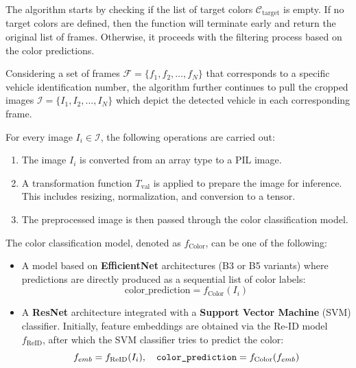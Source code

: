 The algorithm starts by checking if the list of target colors $\mathcal{C}_{\text{target}}$ is empty. If no target colors are defined, then the function will terminate early and return the original list of frames. Otherwise, it proceeds with the filtering process based on the color predictions.

Considering a set of frames \(\mathcal{F} = \{f_1, f_2, \ldots, f_N\}\) that corresponds to a specific vehicle identification number, the algorithm further continues to pull the cropped images \(\mathcal{I} = \{I_1, I_2, \ldots, I_N\}\) which depict the detected vehicle in each corresponding frame.

For every image \(I_i \in \mathcal{I}\), the following operations are carried out:
\begin{enumerate}
    \item The image \(I_i\) is converted from an array type to a PIL image.
    \item A transformation function \(T_{\text{val}}\) is applied to prepare the image for inference. This includes resizing, normalization, and conversion to a tensor.
    \item The preprocessed image is then passed through the color classification model.
\end{enumerate}

The color classification model, denoted as $f_{\text{Color}}$, can be one of the following:
\begin{itemize}
    \item A model based on \textbf{EfficientNet} architectures (B3 or B5 variants) where predictions are directly produced as a sequential list of color labels:
    \[
        \text{color\_prediction} = f_{\text{Color}}(I_{i})
    \]
    \item A \textbf{ResNet} architecture integrated with a \textbf{Support Vector Machine} (SVM) classifier. Initially, feature embeddings are obtained via the Re-ID model \(f_{\text{ReID}}\), after which the SVM classifier tries to predict the color:
    \[
        f_{emb} = f_{\text{ReID}}(I_i), \quad \verb|color_prediction| = f_{\text{Color}}(f_{emb})
    \]
\end{itemize}


